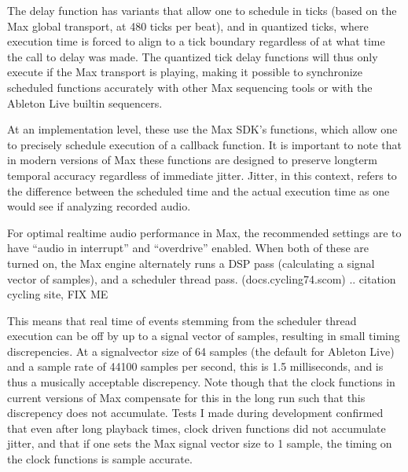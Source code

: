 \documentclass[letterpaper,10pt,english]{sphinxmanual}
\begin{document}
\sphinxAtStartPar
The delay function has variants that allow one to schedule
in ticks (based on the Max global transport, at 480 ticks per beat),
and in quantized ticks, where execution time is forced to align to a tick
boundary regardless of at what time the call to delay was made.
The quantized tick delay functions will thus only execute if the Max transport is
playing, making it possible to synchronize scheduled functions accurately
with other Max sequencing tools or with the Ableton Live built\sphinxhyphen{}in sequencers.

\begin{sphinxVerbatim}[commandchars=\\\{\}]

\end{sphinxVerbatim}

\sphinxAtStartPar
At an implementation level, these use the Max SDK’s  functions,
which allow one to precisely schedule
execution of a callback function. It is important to note that in
modern versions of Max these functions are designed to preserve
long\sphinxhyphen{}term temporal accuracy regardless of immediate jitter.
Jitter, in this context, refers to the difference between the scheduled
time and the actual execution time as one would see if analyzing recorded audio.

\sphinxAtStartPar
For optimal real\sphinxhyphen{}time audio performance in Max, the recommended
settings are to have “audio in interrupt” and “overdrive” enabled.
When both of these are turned on, the Max engine alternately runs
a DSP pass (calculating a signal vector of samples), and a scheduler
thread pass. (docs.cycling74.scom)
.. citation cycling site, FIX ME

\sphinxAtStartPar
This means that real time of events stemming from
the scheduler thread execution can be off by up to a signal
vector of samples, resulting in small timing discrepencies.
At a signal\sphinxhyphen{}vector size of 64 samples (the default for Ableton Live) and
a sample rate of 44100 samples per second, this is 1.5 milliseconds,
and is thus a musically acceptable discrepency.
Note though that the clock functions
in current versions of Max compensate for this in the long run such
that this discrepency does not accumulate.
Tests I made during development confirmed that even after long
playback times, clock driven functions did not accumulate jitter,
and that if one sets the Max signal vector size to 1 sample,
the timing on the clock functions is sample accurate.
\end{document}

